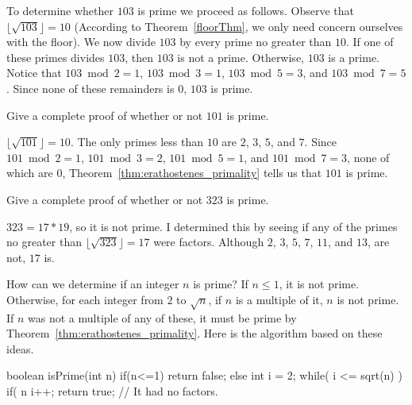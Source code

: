 \begin{exa}
To determine whether $103$ is prime we proceed as follows. 
Observe that $\lfloor \sqrt{103} \rfloor = 10$ 
(According to Theorem~\ref{floorThm}, we only need concern ourselves with the floor).
We now divide $103$ by every prime no greater than $10$. If one of these primes divides $103$, then $103$
is not a prime. Otherwise, $103$ is a prime. 
Notice that 
$103 \bmod 2 = 1$, $103 \bmod 3 = 1$, $103 \bmod 5 = 3$, and $103 \bmod 7 = 5$.
Since none of these remainders is $0$, $103$ is prime.
\end{exa}

\begin{exer}
Give a complete proof of whether or not $101$ is prime.\\
\pflinetwo
\begin{answer}
$\lfloor \sqrt{101}\rfloor=10$.  The only primes less than $10$ are $2$, $3$, $5$, and $7$.
Since $101\bmod 2=1$, $101\bmod 3 = 2$, $101\bmod 5 = 1$, and $101\bmod 7 = 3$, none of
which are $0$, Theorem~\ref{thm:erathostenes_primality} tells us that $101$ is prime.
\end{answer}
\end{exer}

\begin{exer}
Give a complete proof of whether or not $323$ is prime.\\
\pflinetwo
\begin{answer}
$323=17*19$, so it is not prime.  I determined this by seeing if any of the primes
no greater than $\lfloor\sqrt{323}\rfloor=17$ were factors.
Although $2$, $3$, $5$, $7$, $11$, and $13$, are not, $17$ is.
\end{answer}
\end{exer}


\begin{exa}\label{exa:primality}
How can we determine if an integer $n$ is prime?
If $n\leq 1$, it is not prime.
Otherwise, for each integer from $2$ to $\sqrt{n}$,
if $n$ is a multiple of it, $n$ is not prime.
If $n$ was not a multiple of any of these, it must be prime
by Theorem~\ref{thm:erathostenes_primality}.  
Here is the algorithm based on these ideas.
\label{exa:isprime1}
\begin{code}
boolean isPrime(int n) {
    if(n<=1) {  return false; }
    else {
        int i = 2;
        while( i <= sqrt(n) ) {
            if( n%
            i++;
        }
        return true;  // It had no factors.
}   }
\end{code}
\end{exa}


